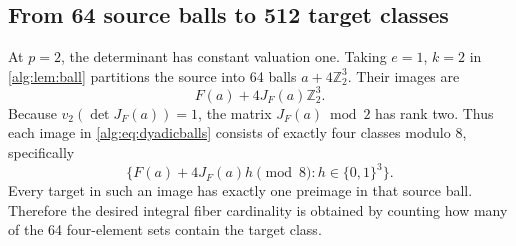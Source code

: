 \documentclass[11pt]{article}
\numberwithin{equation}{section}
\theoremstyle{plain}
\theoremstyle{plain}
\theoremstyle{plain}
\theoremstyle{definition}
\theoremstyle{definition}
\theoremstyle{definition}
\theoremstyle{remark}
\newcommand{\Z}{\mathbb Z}\newcommand{\Q}{\mathbb Q}
\begin{document}
\subsection{From 64 source balls to 512 target classes}
At $p=2$, the determinant has constant valuation one. Taking $e=1$,
$k=2$ in \cref{alg:lem:ball} partitions the source into 64 balls
$a+4\Z_2^3$. Their images are
\begin{equation}\label{alg:eq:dyadicballs}
 F(a)+4J_F(a)\Z_2^3.
\end{equation}
Because $v_2(\det J_F(a))=1$, the matrix $J_F(a)\bmod2$ has rank two.
Thus each image in \eqref{alg:eq:dyadicballs} consists of exactly four
classes modulo $8$, specifically
\begin{equation}\label{alg:eq:finiteballimage}
 \{F(a)+4J_F(a)h\pmod8:h\in\{0,1\}^3\}.
\end{equation}
Every target in such an image has exactly one preimage in that source
ball. Therefore the desired integral fiber cardinality is obtained by
counting how many of the 64 four-element sets contain the target class.
\end{document}
